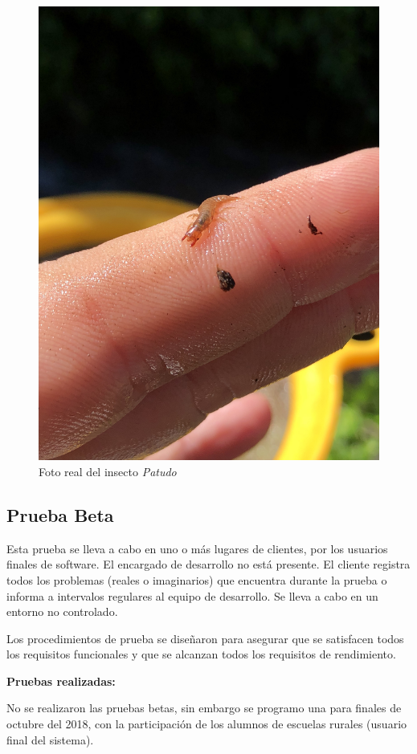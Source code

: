 		\begin{figure}[H]
			\centering
				\includegraphics[width=1\textwidth]{imagenes/testAlpha/6.jpg}
					\caption{Foto real del insecto \textit{Patudo}}
		\end{figure}
		
	\subsection{Prueba Beta}

		Esta prueba se lleva a cabo en uno o más lugares de clientes, por los usuarios finales de software. El encargado de desarrollo no está presente. El cliente registra todos los problemas (reales o imaginarios) que  encuentra durante la prueba o informa a intervalos regulares al equipo de desarrollo. Se lleva a cabo en un entorno no controlado.

		Los procedimientos de prueba se diseñaron para asegurar que se satisfacen todos los requisitos funcionales y que se alcanzan todos los requisitos de rendimiento.
		\newline

		\textbf{Pruebas realizadas:}
		
		No se realizaron las pruebas betas, sin embargo se programo una para finales de octubre del 2018, con la participación de los alumnos de escuelas rurales (usuario final del sistema).
